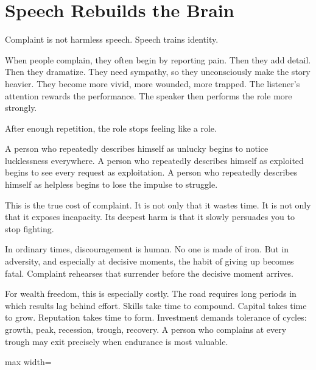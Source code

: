 \section*{Speech Rebuilds the Brain}

Complaint is not harmless speech. Speech trains identity.

When people complain, they often begin by reporting pain. Then they add detail. Then they dramatize. They need sympathy, so they unconsciously make the story heavier. They become more vivid, more wounded, more trapped. The listener's attention rewards the performance. The speaker then performs the role more strongly.

After enough repetition, the role stops feeling like a role.

A person who repeatedly describes himself as unlucky begins to notice lucklessness everywhere. A person who repeatedly describes himself as exploited begins to see every request as exploitation. A person who repeatedly describes himself as helpless begins to lose the impulse to struggle.

This is the true cost of complaint. It is not only that it wastes time. It is not only that it exposes incapacity. Its deepest harm is that it slowly persuades you to stop fighting.

In ordinary times, discouragement is human. No one is made of iron. But in adversity, and especially at decisive moments, the habit of giving up becomes fatal. Complaint rehearses that surrender before the decisive moment arrives.

For wealth freedom, this is especially costly. The road requires long periods in which results lag behind effort. Skills take time to compound. Capital takes time to grow. Reputation takes time to form. Investment demands tolerance of cycles: growth, peak, recession, trough, recovery. A person who complains at every trough may exit precisely when endurance is most valuable.

\begin{center}
\begin{adjustbox}{max width=\linewidth}
\end{adjustbox}
\end{center}

